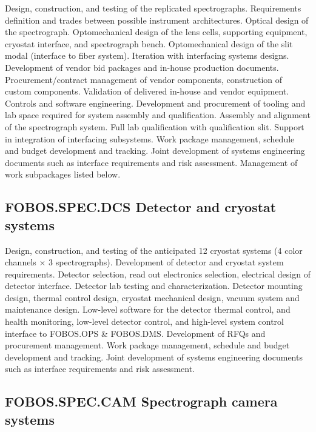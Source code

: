 \documentclass[oneside,11pt]{amsart}
\begin{document}
Design, construction, and testing of the replicated spectrographs.
Requirements definition and trades between possible instrument
architectures. Optical design of the spectrograph. Optomechanical
design of the lens cells, supporting equipment, cryostat interface,
and spectrograph bench. Optomechanical design of the slit modal
(interface to fiber system). Iteration with interfacing systems
designs. Development of vendor bid packages and in-house production
documents. Procurement/contract management of vendor components,
construction of custom components. Validation of delivered in-house
and vendor equipment. Controls and software engineering. Development
and procurement of tooling and lab space required for system assembly
and qualification. Assembly and alignment of the spectrograph system.
Full lab qualification with qualification slit. Support in
integration of interfacing subsystems. Work package management,
schedule and budget development and tracking. Joint development of
systems engineering documents such as interface requirements and risk
assessment. Management of work subpackages listed below.

\subsection{FOBOS.SPEC.DCS Detector and cryostat systems}

Design, construction, and testing of the anticipated 12 cryostat
systems (4 color channels $\times$ 3 spectrographs). Development of
detector and cryostat system requirements. Detector selection, read
out electronics selection, electrical design of detector interface.
Detector lab testing and characterization. Detector mounting design,
thermal control design, cryostat mechanical design, vacuum system and
maintenance design. Low-level software for the detector thermal
control, and health monitoring, low-level detector control, and
high-level system control interface to FOBOS.OPS \& FOBOS.DMS.
Development of RFQs and procurement management. Work package
management, schedule and budget development and tracking. Joint
development of systems engineering documents such as interface
requirements and risk assessment.

\subsection{FOBOS.SPEC.CAM Spectrograph camera systems}
\end{document}
